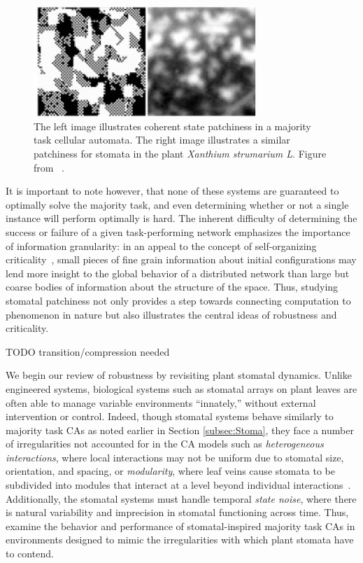 \documentclass[a4paper,11pt]{article}
\begin{document}
\begin{figure}[htp]
	\centering
	\includegraphics[width=0.75\textwidth]{me07_fig3_ca_stoma_comparison.png}
	\caption[Qualitative CA-Stomata Comparison]{
	The left image illustrates coherent state patchiness in a majority task cellular automata. The right image illustrates a similar patchiness for stomata in the plant \textit{Xanthium strumarium L}. Figure from \citeauthor{me07}~\cite{me07}.
	}
	\label{fig:ca_stoma}
\end{figure}

It is important to note however, that none of these systems are guaranteed to optimally solve the majority task, and even determining whether or not a single instance will perform optimally is hard. The inherent difficulty of determining the success or failure of a given task-performing network emphasizes the importance of information granularity: in an appeal to the concept of self-organizing criticality~\cite{ba88}, small pieces of fine grain information about initial configurations may lend more insight to the global behavior of a distributed network than large but coarse bodies of information about the structure of the space. Thus, studying stomatal patchiness not only provides a step towards connecting computation to phenomenon in nature but also illustrates the central ideas of robustness and criticality.

TODO transition/compression needed

We begin our review of robustness by revisiting plant stomatal dynamics. Unlike engineered systems, biological systems such as stomatal arrays on plant leaves are often able to manage variable environments ``innately,'' without external intervention or control. Indeed, though stomatal systems behave similarly to majority task CAs as noted earlier in Section \ref{subsec:Stoma}, they face a number of irregularities not accounted for in the CA models such as \textit{heterogeneous interactions}, where local interactions may not be uniform due to stomatal size, orientation, and spacing,  or \textit{modularity}, where leaf veins cause stomata to be subdivided into modules that interact at a level beyond individual interactions~\cite{me07}. Additionally, the stomatal systems must handle temporal \textit{state noise}, where there is natural variability and imprecision in stomatal functioning across time. Thus, \citeauthor{me07} examine the behavior and performance of stomatal-inspired majority task CAs in environments designed to mimic the irregularities with which plant stomata have to contend.
\end{document}
